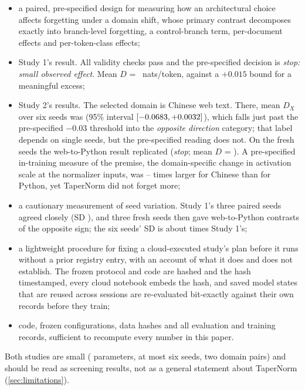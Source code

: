 \documentclass[11pt]{article}
\begin{document}
\begin{itemize}[leftmargin=1.4em,itemsep=2pt]
  \item a paired, pre-specified design for measuring how an architectural choice affects forgetting under a
        domain shift, whose primary contrast decomposes exactly into branch-level forgetting, a control-branch
        term, per-document effects and per-token-class effects;
  \item Study 1's result. All validity checks pass and the pre-specified decision is \emph{stop: small observed
        effect}. Mean $D$ = \Dmean{}~nats/token, against a $+0.015$ bound for a meaningful excess;
  \item Study 2's results. The selected domain is Chinese web text. There, mean $D_X$ over six seeds was
        \twoDmean{} (95\% interval $[-0.0683, {+}0.0032]$), which falls just past the pre-specified $-0.03$
        threshold into the \emph{opposite direction} category; that label depends on single seeds, but the
        pre-specified reading does not. On the fresh seeds the web-to-Python result replicated (\emph{stop}; mean
        $D$ = \repDmean). A pre-specified in-training measure of the premise, the domain-specific change in
        activation scale at the normalizer inputs, was \mcRatioLo--\mcRatioHi{} times larger for Chinese than for
        Python, yet TaperNorm did not forget more;
  \item a cautionary measurement of seed variation. Study 1's three paired seeds agreed closely (SD \Dsd), and
        three fresh seeds then gave web-to-Python contrasts of the opposite sign; the six seeds' SD is about
        \poolSdRatio{} times Study 1's;
  \item a lightweight procedure for fixing a cloud-executed study's plan before it runs without a prior registry
        entry, with an account of what it does and does not establish. The frozen protocol and code are hashed
        and the hash timestamped, every cloud notebook embeds the hash, and saved model states that are reused
        across sessions are re-evaluated bit-exactly against their own records before they train;
  \item code, frozen configurations, data hashes and all evaluation and training records, sufficient to recompute
        every number in this paper.
\end{itemize}
Both studies are small (\paramsRMS{} parameters, at most six seeds, two domain pairs) and should be read as
screening results, not as a general statement about TaperNorm (\cref{sec:limitations}).
\end{document}
